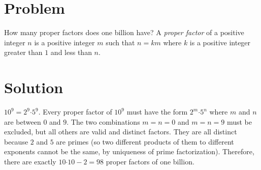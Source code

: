 \documentclass[11pt,a4paper]{report}
\theoremstyle{plain}
\theoremstyle{definition}
\theoremstyle{remark}
\begin{document}
\section*{Problem} How many proper factors does one billion have?  A
\emph{proper factor} of a positive integer $n$ is a positive integer $m$ such
that $n = km$ where $k$ is a positive integer greater than $1$ and less than
$n$.

\section*{Solution} $10^9 = 2^9 \mathord{\cdot} 5^9.$  Every proper factor of
$10^9$ must have the form $2^m \mathord{\cdot} 5^n$ where $m$ and $n$ are
between $0$ and $9$.  The two combinations $m = n = 0$ and $m = n = 9$ must be
excluded, but all others are valid and distinct factors.  They are all distinct
because $2$ and $5$ are primes (so two different products of them to different
exponents cannot be the same, by uniqueness of prime factorization).  Therefore,
there are exactly $10 \mathord{\cdot} 10 - 2 = 98$ proper factors of one
billion.
\end{document}
